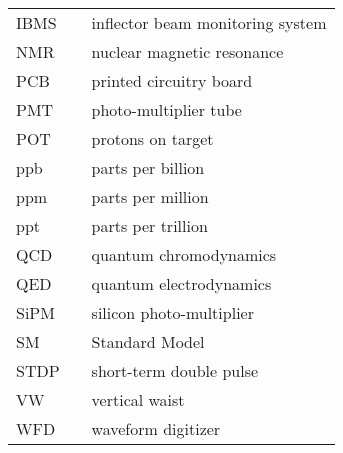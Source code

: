 {\begin{center}
\begin{tabular}{lll}
    IBMS & \dotfill & inflector beam monitoring system \\
    NMR & \dotfill & nuclear magnetic resonance \\
    PCB & \dotfill & printed circuitry board \\
    PMT  & \dotfill & photo-multiplier tube \\
    POT & \dotfill & protons on target \\
    ppb & \dotfill & parts per billion \\
    ppm & \dotfill & parts per million \\
    ppt & \dotfill & parts per trillion \\
    QCD & \dotfill & quantum chromodynamics \\
    QED & \dotfill & quantum electrodynamics \\
    SiPM & \dotfill & silicon photo-multiplier \\
    SM & \dotfill & Standard Model \\
    STDP & \dotfill & short-term double pulse \\
    VW & \dotfill & vertical waist \\
    WFD & \dotfill & waveform digitizer \\

  \end{tabular}
\end{center}
\cleardoublepage

} %


\newpage
\endofprelim
